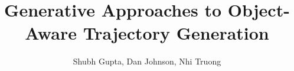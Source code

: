 \documentclass[final]{beamer}
\title{\Huge Generative Approaches to Object-Aware Trajectory Generation}
\author{\LARGE Shubh Gupta, Dan Johnson, Nhi Truong}
\institute{\Large Stanford University, CS 236} %
\begin{document}




\begin{frame}[t] %
\maketitle
\end{frame} %
\end{document}
